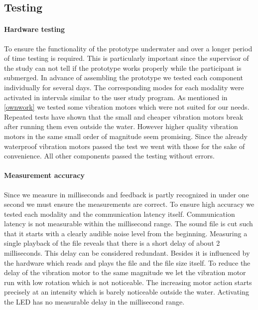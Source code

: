 \subsection{Testing}
\paragraph{Hardware testing}
To ensure the functionality of the prototype underwater and over a longer period of time testing is required. 
This is particularly important since the supervisor of the study can not tell if the prototype works properly while the participant is submerged. 
In advance of assembling the prototype we tested each component individually for several days. 
The corresponding modes for each modality were activated in intervals similar to the user study program. 
As mentioned in \ref{ownwork} we tested some vibration motors which were not suited for our needs. 
Repeated tests have shown that the small and cheaper vibration motors break after running them even outside the water. 
However higher quality vibration motors in the same small order of magnitude seem promising. 
Since the already waterproof vibration motors passed the test we went with those for the sake of convenience. 
All other components passed the testing without errors.

\paragraph{Measurement accuracy}
Since we measure in milliseconds and feedback is partly recognized in under one second we must ensure the measurements are correct. To ensure high accuracy we tested each modality and the communication latency itself. Communication latency is not measurable within the millisecond range. 
The sound file is cut such that it starts with a clearly audible noise level from the beginning. Measuring a single playback of the file reveals that there is a short delay of about 2 milliseconds. 
This delay can be considered redundant. 
Besides it is influenced by the hardware which reads and plays the file and the file size itself. To reduce the delay of the vibration motor to the same magnitude we let the vibration motor run with low rotation which is not noticeable. The increasing motor action starts precisely at an intensity which is barely noticeable outside the water. Activating the LED has no measurable delay in the millisecond range.























